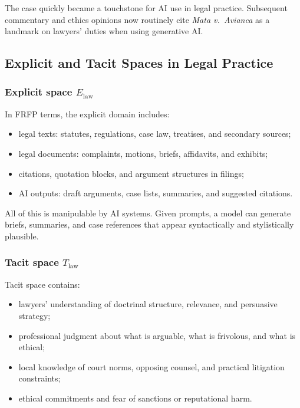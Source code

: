 The case quickly became a touchstone for AI use in legal practice.
Subsequent commentary and ethics opinions now routinely cite \emph{Mata v.\
Avianca} as a landmark on lawyers’ duties when using generative AI.

\subsection{Explicit and Tacit Spaces in Legal Practice}

\subsubsection*{Explicit space \(E_{\mathrm{law}}\)}

In FRFP terms, the explicit domain includes:

\begin{itemize}
  \item legal texts: statutes, regulations, case law, treatises, and
        secondary sources;
  \item legal documents: complaints, motions, briefs, affidavits, and
        exhibits;
  \item citations, quotation blocks, and argument structures in filings;
  \item AI outputs: draft arguments, case lists, summaries, and suggested
        citations.
\end{itemize}

All of this is manipulable by AI systems.
Given prompts, a model can generate briefs, summaries, and case references
that appear syntactically and stylistically plausible.

\subsubsection*{Tacit space \(T_{\mathrm{law}}\)}

Tacit space contains:

\begin{itemize}
  \item lawyers’ understanding of doctrinal structure, relevance, and
        persuasive strategy;
  \item professional judgment about what is arguable, what is frivolous,
        and what is ethical;
  \item local knowledge of court norms, opposing counsel, and practical
        litigation constraints;
  \item ethical commitments and fear of sanctions or reputational harm.
\end{itemize}

